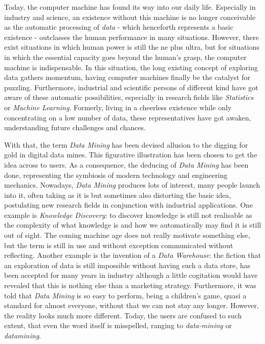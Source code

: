 \documentclass[10pt,latex8]{article}
\begin{document}
Today, the computer machine has found its way into our daily life. Especially in industry and science, an existence without this machine is no longer conceivable as the automatic processing of \textit{data} - which henceforth represents a basic existence - outclasses the human performance in many situations. However, there exist situations in which human power is still the ne plus ultra, but for situations in which the essential capacity goes beyond the human's grasp, the computer machine is indispensable. In this situation, the long existing concept of exploring data gathers momentum, having computer machines finally be the catalyst for puzzling. Furthermore, industrial and scientific persons of different kind have got aware of these automatic possibilities, especially in research fields like \textit{Statistics} or \textit{Machine Learning}. Formerly, living in a cheerless existence while only concentrating on a low number of data, these representatives have got awaken, understanding future challenges and chances.

With that, the term \textit{Data Mining} has been devised allusion to the digging for gold in digital data mines. This figurative illustration has been chosen to get the idea across to users. As a consequence, the deducing of \textit{Data Mining} has been done, representing the symbiosis of modern technology and engineering mechanics. Nowadays, \textit{Data Mining} produces lots of interest, many people launch into it, often taking as it is but sometimes also distorting the basic idea, postulating new research fields in conjunction with industrial applications. One example is \textit{Knowledge Discovery}: to discover knowledge is still not realisable as the complexity of what knowledge is and how we automatically may find it is still out of sight. The coming machine age does not really motivate something else, but the term is still in use and without exception communicated without reflecting. Another example is the invention of a \textit{Data Warehouse}: the fiction that an exploration of data is still impossible without having such a data store, has been accepted for many years in industry although a little cogitation would have revealed that this is nothing else than a marketing strategy. Furthermore, it was told that \textit{Data Mining} is so easy to perform, being a children's game, quasi a standard for almost everyone, without that we can not stay any longer.  However, the reality looks much more different. Today, the users are confused to such extent, that even the word itself is misspelled, ranging to \textit{data-mining} or \textit{datamining}.
\end{document}
